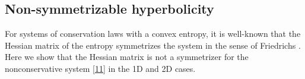\documentclass{article}
\theoremstyle{plain}
\begin{document}
%


\subsection{Non-symmetrizable hyperbolicity}
For systems of conservation laws with a convex entropy, it is well-known that the Hessian matrix of the entropy symmetrizes the system in the sense of Friedrichs \cite{friedrichs1971systems}. Here we show that the Hessian matrix is not a symmetrizer for the nonconservative system \eqref{11} in the 1D and 2D cases.
\end{document}
